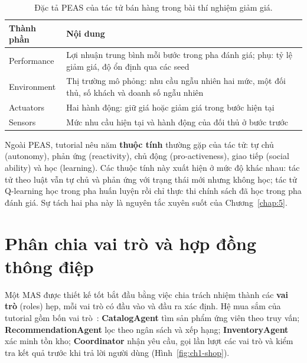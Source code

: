 \begin{table}[!htbp]\centering\caption{Đặc tả PEAS của tác tử bán hàng trong bài thí nghiệm giảm giá.}\label{tab:ch1-peas}
{\small\begin{tabular}{@{}L{3.2cm}L{11.3cm}@{}}\toprule
Thành phần & Nội dung \\\midrule
Performance & Lợi nhuận trung bình mỗi bước trong pha đánh giá; phụ: tỷ lệ giảm giá, độ ổn định qua các seed \\
Environment & Thị trường mô phỏng: nhu cầu ngẫu nhiên hai mức, một đối thủ, số khách và doanh số ngẫu nhiên \\
Actuators   & Hai hành động: giữ giá hoặc giảm giá trong bước hiện tại \\
Sensors     & Mức nhu cầu hiện tại và hành động của đối thủ ở bước trước \\\bottomrule
\end{tabular}}
\end{table}

Ngoài PEAS, tutorial nêu năm \textbf{thuộc tính} thường gặp của tác tử: tự chủ (autonomy), phản ứng (reactivity),
chủ động (pro-activeness), giao tiếp (social ability) và học (learning). Các thuộc tính này xuất hiện ở mức độ khác
nhau: tác tử theo luật vẫn tự chủ và phản ứng với trạng thái mới nhưng không học; tác tử Q-learning học trong pha
huấn luyện rồi chỉ thực thi chính sách đã học trong pha đánh giá. Sự tách hai pha này là nguyên tắc xuyên suốt của
Chương~\ref{chap:5}.

\section{Phân chia vai trò và hợp đồng thông điệp}

Một MAS được thiết kế tốt bắt đầu bằng việc chia trách nhiệm thành các \textbf{vai trò} (roles) hẹp, mỗi vai trò
có đầu vào và đầu ra xác định. Hệ mua sắm của tutorial gồm bốn vai trò~\cite{ch1:tutorial}:
\textbf{CatalogAgent} tìm sản phẩm ứng viên theo truy vấn; \textbf{RecommendationAgent} lọc theo ngân sách và xếp
hạng; \textbf{InventoryAgent} xác minh tồn kho; \textbf{Coordinator} nhận yêu cầu, gọi lần lượt các vai trò và
kiểm tra kết quả trước khi trả lời người dùng (Hình~\ref{fig:ch1-shop}).



